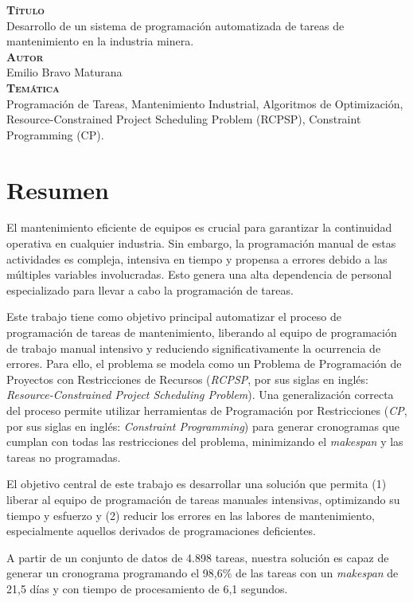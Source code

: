 \documentclass{article}
\begin{document}
{\bfseries\scshape Título}\\[.25cm]
Desarrollo de un sistema de programación automatizada de tareas de mantenimiento en la industria minera.\\


{\bfseries\scshape Autor}\\[.25cm]
Emilio Bravo Maturana\\

{\bfseries\scshape Temática}\\[.25cm]
Programación de Tareas, Mantenimiento Industrial, Algoritmos de Optimización, Resource-Constrained Project Scheduling Problem (RCPSP), Constraint Programming (CP).

\newpage

\section*{Resumen}
El mantenimiento eficiente de equipos es crucial para garantizar la continuidad operativa en cualquier industria. Sin embargo, la programación manual de estas actividades es compleja, intensiva en tiempo y propensa a errores debido a las múltiples variables involucradas. Esto genera una alta dependencia de personal especializado para llevar a cabo la programación de tareas.

Este trabajo tiene como objetivo principal automatizar el proceso de programación de tareas de mantenimiento, liberando al equipo de programación de trabajo manual intensivo y reduciendo significativamente la ocurrencia de errores. Para ello, el problema se modela como un Problema de Programación de Proyectos con Restricciones de Recursos (\textit{RCPSP}, por sus siglas en inglés: \textit{Resource-Constrained Project Scheduling Problem}). Una generalización correcta del proceso permite utilizar herramientas de Programación por Restricciones (\textit{CP}, por sus siglas en inglés: \textit{Constraint Programming}) para generar cronogramas que cumplan con todas las restricciones del problema, minimizando el \textit{makespan} y las tareas no programadas.

El objetivo central de este trabajo es desarrollar una solución que permita (1) liberar al equipo de programación de tareas manuales intensivas, optimizando su tiempo y esfuerzo y (2) reducir los errores en las labores de mantenimiento, especialmente aquellos derivados de programaciones deficientes.

A partir de un conjunto de datos de 4.898 tareas, nuestra solución es capaz de generar un cronograma programando el 98,6\% de las tareas con un \textit{makespan} de 21,5 días y con tiempo de procesamiento de 6,1 segundos.
\newpage
\end{document}
